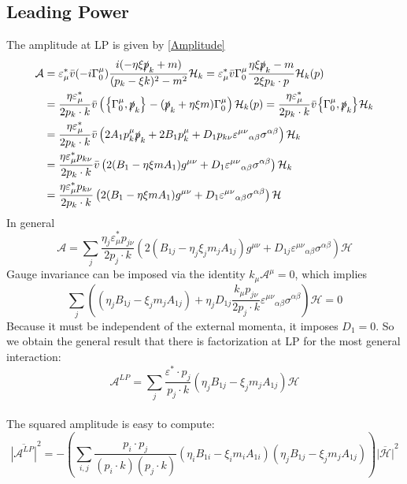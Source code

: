 \documentclass{article}
\newcommand{\s}[1]{\slashed #1}
\begin{document}
\subsection{Leading Power}
The amplitude at LP is given by \eqref{Amplitude}
\begin{align*}
	\mathcal{A} &= \varepsilon^*_\mu\bar{v}(-i\Gamma^\mu_0)\frac{i(-\eta\xi \s{p}_k + m)}{(p_k -\xi k)^2 - m^2} \mathcal{H}_k
	= \varepsilon^*_\mu\bar{v}\Gamma^\mu_0\frac{\eta\xi\s{p}_k - m}{2\xi p_k\cdot p} \mathcal{H}_k(p)\\&
	= \frac{\eta \varepsilon^*_\mu}{2p_k\cdot k}\bar{v}\left(\acomm{\Gamma^\mu_0}{\s{p}_k} - (\s{p}_k + \eta\xi m)\Gamma^\mu_0\right) \mathcal{H}_k(p)
	= \frac{\eta \varepsilon^*_\mu}{2p_k\cdot k}\bar{v}\acomm{\Gamma^\mu_0}{\s{p}_k} \mathcal{H}_k\\&
	= \frac{\eta\varepsilon^*_\mu}{2p_k\cdot k}\bar{v}\left(2A_1p_k^\mu\s{p}_k + 2B_1p_k^\mu + D_1 p_{k\nu} \varepsilon^{\mu\nu}{}_{\alpha\beta}\sigma^{\alpha\beta}\right) \mathcal{H}_k\\&
	= \frac{\eta\varepsilon^*_\mu p_{k\nu}}{2p_k\cdot k}\bar{v}\left(2(B_1-\eta\xi mA_1)g^{\mu\nu} + D_1 \varepsilon^{\mu\nu}{}_{\alpha\beta}\sigma^{\alpha\beta}\right) \mathcal{H}_k\\&
	= \frac{\eta\varepsilon^*_\mu p_{k\nu}}{2p_k\cdot k}\left(2(B_1-\eta\xi mA_1)g^{\mu\nu} + D_1 \varepsilon^{\mu\nu}{}_{\alpha\beta}\sigma^{\alpha\beta}\right) \mathcal{H}
\end{align*}
In general
\begin{equation}
	\mathcal{A} = \sum_j\frac{\eta_j\varepsilon^*_\mu p_{j\nu}}{2p_j\cdot k}\left(2(B_{1j}-\eta_j\xi_jm_jA_{1j})g^{\mu\nu} + D_{1j} \varepsilon^{\mu\nu}{}_{\alpha\beta}\sigma^{\alpha\beta}\right) \mathcal{H}
\end{equation}
Gauge invariance can be imposed via the identity $k_\mu \mathcal{A}^\mu = 0$, which implies
\begin{equation}
	\sum_j\left((\eta_j B_{1j}-\xi_jm_jA_{1j}) + \eta_j D_{1j} \frac{k_\mu p_{j\nu}}{2p_j\cdot k}\varepsilon^{\mu\nu}{}_{\alpha\beta}\sigma^{\alpha\beta}\right) \mathcal{H} = 0
\end{equation}
Because it must be independent of the external momenta, it imposes $D_1=0$. So we obtain the general result that there is factorization at LP for the most general interaction:
\begin{equation}
	\mathcal{A}^{LP} = \sum_j\frac{\varepsilon^*\cdot p_{j}}{p_j\cdot k}\left(\eta_jB_{1j}-\xi_jm_jA_{1j}\right) \mathcal{H}
\end{equation}
\\
The squared amplitude is easy to compute:
\begin{equation}
	\overline{|\mathcal{A}^{LP}|}^2 = -\left(\sum_{i,j}\frac{p_{i}\cdot p_j}{(p_i\cdot k)(p_j\cdot k)}\left(\eta_iB_{1i}-\xi_im_iA_{1i}\right)\left(\eta_jB_{1j}-\xi_jm_jA_{1j}\right)\right) \overline{|\mathcal{H}|}^2
\end{equation}
\end{document}
